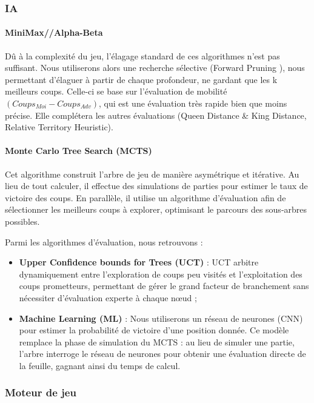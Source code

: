 \documentclass[11pt,a4paper,titlepage,oneside]{article}
\begin{document}
    \subsubsection{IA}
    \paragraph{MiniMax//Alpha-Beta}
    Dû à la complexité du jeu, l'élagage standard de ces algorithmes n'est pas suffisant. Nous utiliserons alors une recherche sélective (Forward Pruning \cite{fpruning}), nous permettant d'élaguer à partir de chaque profondeur, ne gardant que les k meilleurs coups. Celle-ci se base sur l'évaluation de mobilité $(Coups_{Moi} - Coups_{Adv})$, qui est une évaluation très rapide bien que moins précise. Elle complétera les autres évaluations (Queen Distance \& King Distance, Relative Territory Heuristic).

    \paragraph{Monte Carlo Tree Search (MCTS)}
    Cet algorithme construit l'arbre de jeu de manière asymétrique et itérative. Au lieu de tout calculer, il effectue des simulations de parties pour estimer le taux de victoire des coups. En parallèle, il utilise un algorithme d'évaluation afin de sélectionner les meilleurs coups à explorer, optimisant le parcours des sous-arbres possibles.

    Parmi les algorithmes d'évaluation, nous retrouvons :
    \begin{itemize}
    \item{\textbf{Upper Confidence bounds for Trees (UCT)}} \cite{uct} :
        UCT arbitre dynamiquement entre l'exploration de coups peu visités et l'exploitation des coups prometteurs, permettant de gérer le grand facteur de branchement sans nécessiter d'évaluation experte à chaque nœud ;
    \item{\textbf{Machine Learning (ML)}} :
        Nous utiliserons un réseau de neurones (CNN) pour estimer la probabilité de victoire d'une position donnée. Ce modèle remplace la phase de simulation du MCTS : au lieu de simuler une partie, l'arbre interroge le réseau de neurones pour obtenir une évaluation directe de la feuille, gagnant ainsi du temps de calcul.
    \end{itemize}

    \subsubsection{Moteur de jeu}
\end{document}

